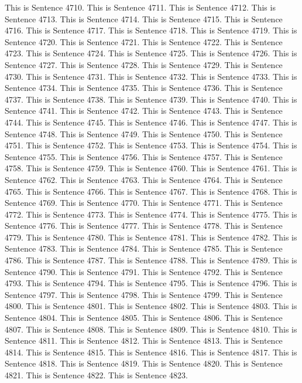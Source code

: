 \documentclass{article}
\begin{document}
This is Sentence 4710.
This is Sentence 4711.
This is Sentence 4712.
This is Sentence 4713.
This is Sentence 4714.
This is Sentence 4715.
This is Sentence 4716.
This is Sentence 4717.
This is Sentence 4718.
This is Sentence 4719.
This is Sentence 4720.
This is Sentence 4721.
This is Sentence 4722.
This is Sentence 4723.
This is Sentence 4724.
This is Sentence 4725.
This is Sentence 4726.
This is Sentence 4727.
This is Sentence 4728.
This is Sentence 4729.
This is Sentence 4730.
This is Sentence 4731.
This is Sentence 4732.
This is Sentence 4733.
This is Sentence 4734.
This is Sentence 4735.
This is Sentence 4736.
This is Sentence 4737.
This is Sentence 4738.
This is Sentence 4739.
This is Sentence 4740.
This is Sentence 4741.
This is Sentence 4742.
This is Sentence 4743.
This is Sentence 4744.
This is Sentence 4745.
This is Sentence 4746.
This is Sentence 4747.
This is Sentence 4748.
This is Sentence 4749.
This is Sentence 4750.
This is Sentence 4751.
This is Sentence 4752.
This is Sentence 4753.
This is Sentence 4754.
This is Sentence 4755.
This is Sentence 4756.
This is Sentence 4757.
This is Sentence 4758.
This is Sentence 4759.
This is Sentence 4760.
This is Sentence 4761.
This is Sentence 4762.
This is Sentence 4763.
This is Sentence 4764.
This is Sentence 4765.
This is Sentence 4766.
This is Sentence 4767.
This is Sentence 4768.
This is Sentence 4769.
This is Sentence 4770.
This is Sentence 4771.
This is Sentence 4772.
This is Sentence 4773.
This is Sentence 4774.
This is Sentence 4775.
This is Sentence 4776.
This is Sentence 4777.
This is Sentence 4778.
This is Sentence 4779.
This is Sentence 4780.
This is Sentence 4781.
This is Sentence 4782.
This is Sentence 4783.
This is Sentence 4784.
This is Sentence 4785.
This is Sentence 4786.
This is Sentence 4787.
This is Sentence 4788.
This is Sentence 4789.
This is Sentence 4790.
This is Sentence 4791.
This is Sentence 4792.
This is Sentence 4793.
This is Sentence 4794.
This is Sentence 4795.
This is Sentence 4796.
This is Sentence 4797.
This is Sentence 4798.
This is Sentence 4799.
This is Sentence 4800.
This is Sentence 4801.
This is Sentence 4802.
This is Sentence 4803.
This is Sentence 4804.
This is Sentence 4805.
This is Sentence 4806.
This is Sentence 4807.
This is Sentence 4808.
This is Sentence 4809.
This is Sentence 4810.
This is Sentence 4811.
This is Sentence 4812.
This is Sentence 4813.
This is Sentence 4814.
This is Sentence 4815.
This is Sentence 4816.
This is Sentence 4817.
This is Sentence 4818.
This is Sentence 4819.
This is Sentence 4820.
This is Sentence 4821.
This is Sentence 4822.
This is Sentence 4823.
\end{document}
